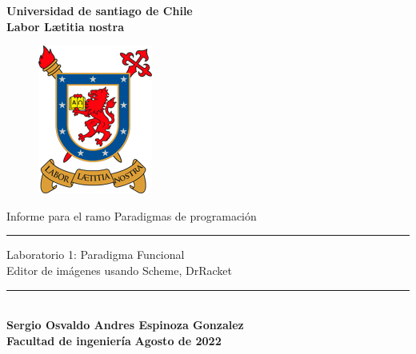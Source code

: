 \begin{titlepage}
    \begin{center}
        {\LARGE \textbf{Universidad de santiago de Chile}}\\
        \vspace{0.25cm}
        {\large \textbf{Labor L\ae titia nostra}}
        \vspace{1cm}
        \begin{figure}[h]
            \centering
            \includegraphics[scale=1.5]{Contenido/Imagenes/Logo color.png}
        \end{figure}
        
        {\Large  Informe para el ramo Paradigmas de programación}
        \vspace{0.3cm}
        \rule{15cm}{0.5mm}
        {\Large Laboratorio 1: Paradigma Funcional\\ Editor de imágenes usando Scheme, DrRacket}
        \rule{15cm}{0.5mm}
        \vspace{2cm}
        \\
        {\Large \textbf{Sergio Osvaldo Andres Espinoza Gonzalez}}\\
        \vspace{0.5cm}
        {\Large \textbf{Facultad de ingeniería}}
        \vfill
        {\Huge \textbf{Agosto de 2022}}
    \end{center}
\end{titlepage}